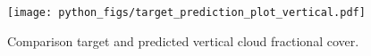 \begin{figure}[ht]
    \centering
    \texttt{[image: python\_figs/target\_prediction\_plot\_vertical.pdf]}
    \caption{Comparison target and predicted vertical cloud fractional cover.}
    \label{fig:target_predict_vertical}
\end{figure}

